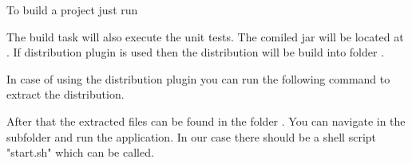 \documentclass[a4paper]{doipdoc}
\begin{document}
	To build a project just run 


	The build task will also execute the unit tests. The comiled jar will be 
	located at . If distribution plugin is used then the 
	distribution will be build into folder .

	In case of using the distribution plugin you can run the following command
	to extract the distribution.


	After that the extracted files can be found in the folder 
	. You can navigate in the subfolder and run the
	application. In our case there should be a shell script "start.sh" 
	which can be called.
\end{document}
